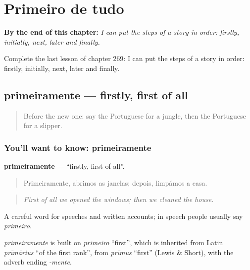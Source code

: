 
\chapter{Primeiro de tudo}
\label{ch:pt-primeiro-de-tudo}

\begin{chapteropening}
\textbf{By the end of this chapter:} \emph{I can put the steps of a story in order: firstly, initially, next, later and finally.}

Complete the last lesson of chapter 269: I can put the steps of a story in order: firstly, initially, next, later and finally.
\end{chapteropening}

\section[primeiramente]{primeiramente — firstly, first of all}

\label{lesson:PT-C269-primeiramente}



\begin{quote}
Before the new one: say the Portuguese for a jungle, then the Portuguese for a slipper.
\end{quote}

\subsection*{You'll want to know: primeiramente}
\textbf{primeiramente} — \textquotedblleft{}firstly, first of all\textquotedblright{}.

\begin{quote}
Primeiramente, abrimos as janelas; depois, limpámos a casa.
\end{quote}

\begin{quote}
\emph{First of all we opened the windows; then we cleaned the house.}
\end{quote}

A careful word for speeches and written accounts; in speech people usually say \emph{primeiro}.

\begin{cousinweb}
\emph{primeiramente} is built on \emph{primeiro} \textquotedblleft{}first\textquotedblright{}, which is inherited from Latin \emph{prīmārius} \textquotedblleft{}of the first rank\textquotedblright{}, from \emph{prīmus} \textquotedblleft{}first\textquotedblright{} (Lewis \& Short), with the adverb ending \emph{-mente}.
\end{cousinweb}

